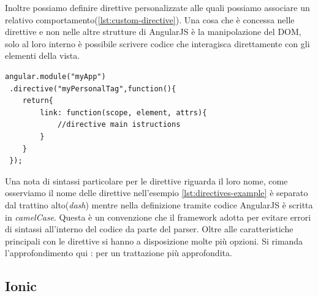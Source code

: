 \begin{description}
Inoltre possiamo definire direttive personalizzate alle quali possiamo associare un relativo comportamento(\ref{lst:custom-directive}). Una cosa che è concessa nelle direttive e non nelle altre strutture di AngularJS è la manipolazione del DOM, solo al loro interno è possibile scrivere codice che interagisca direttamente con gli elementi della vista.
\begin{lstlisting}[language=html,caption={Un esempio di direttiva personalizzata},
				   label={lst:custom-directive}]
 angular.module("myApp")
 .directive("myPersonalTag",function(){
	return{
		link: function(scope, element, attrs){
			//directive main istructions		
		}	
	} 
 });
\end{lstlisting}

Una nota di sintassi particolare per le direttive riguarda il loro nome, come osserviamo il nome delle direttive nell'esempio \ref{lst:directives-example} è separato dal trattino alto(\emph{dash}) mentre nella definizione tramite codice AngularJS è scritta in \emph{camelCase}. Questa è un convenzione che il framework adotta per evitare errori di sintassi all'interno del codice da parte del parser.
Oltre alle caratteristiche principali con le direttive si hanno a disposizione molte più opzioni. Si rimanda l'approfondimento qui : \cite{angularjs:directives} per un trattazione più approfondita.

\end{description} 


\subsection{Ionic}

